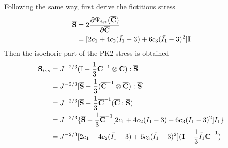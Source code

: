 %
Following the same way, first derive the fictitious stress
\begin{equation} \label{yfictitious}
\begin{split}
\overline{\bold{S}} &= 2\frac{\partial\Psi_{iso}({\overline{\bold{C}})}}{\partial\overline{\bold{C}}} \\
&= [2c_1 + 4c_2(\bar{I_1} - 3) + 6c_3(\bar{I_1} - 3)^2] \bold{I} \\
\end{split}
\end{equation}
Then the isochoric part of the PK2 stress is obtained
\begin{equation} \label{ySiso}
\begin{split}
{\bold{S}}_{iso} &= J^{-2/3}(\mathbb{I} - \frac{1}{3}\bold{C}^{-1} \otimes \bold{C}) : \overline{\bold{S}}\\
&= J^{-2/3} [\overline{\bold{S}} - \frac{1}{3}({\overline{\bold{C}}}^{-1} \otimes  {\overline{\bold{C}}}) :  \overline{\bold{S}}] \\
&= J^{-2/3}[\overline{\bold{S}} - \frac{1}{3} \overline{\bold{C}}^{-1}  (\overline{\bold{C}} : \overline{\bold{S}})] \\
&= J^{-2/3}\{\overline{\bold{S}} - \frac{1}{3} \overline{\bold{C}}^{-1} [2c_1 + 4c_2(\bar{I_1} - 3) + 6c_3(\bar{I_1} - 3)^2] \bar{I_1}\}\\
&= J^{-2/3}[2c_1 + 4c_2(\bar{I_1} - 3) + 6c_3(\bar{I_1} - 3)^2] (\bold{I} - \frac{1}{3}\bar{I_1}{\overline{\bold{C}}}^{-1})
\end{split}
\end{equation}

